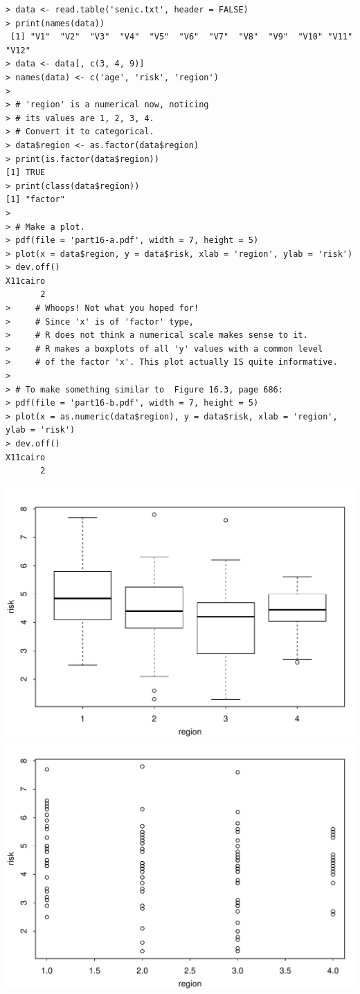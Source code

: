 \documentclass[12pt]{article}
\begin{document}
\begin{verbatim}
> data <- read.table('senic.txt', header = FALSE)
> print(names(data))
 [1] "V1"  "V2"  "V3"  "V4"  "V5"  "V6"  "V7"  "V8"  "V9"  "V10" "V11" "V12"
> data <- data[, c(3, 4, 9)]
> names(data) <- c('age', 'risk', 'region')
> 
> # 'region' is a numerical now, noticing
> # its values are 1, 2, 3, 4.
> # Convert it to categorical.
> data$region <- as.factor(data$region)
> print(is.factor(data$region))
[1] TRUE
> print(class(data$region))
[1] "factor"
> 
> # Make a plot.
> pdf(file = 'part16-a.pdf', width = 7, height = 5)
> plot(x = data$region, y = data$risk, xlab = 'region', ylab = 'risk')
> dev.off()
X11cairo 
       2 
>     # Whoops! Not what you hoped for!
>     # Since 'x' is of 'factor' type,
>     # R does not think a numerical scale makes sense to it.
>     # R makes a boxplots of all 'y' values with a common level
>     # of the factor 'x'. This plot actually IS quite informative.
> 
> # To make something similar to  Figure 16.3, page 686:
> pdf(file = 'part16-b.pdf', width = 7, height = 5)
> plot(x = as.numeric(data$region), y = data$risk, xlab = 'region', ylab = 'risk')
> dev.off()
X11cairo 
       2 
\end{verbatim}

\begin{center}
\includegraphics{part16-a.pdf}
\includegraphics{part16-b.pdf}
\end{center}
\end{document}
